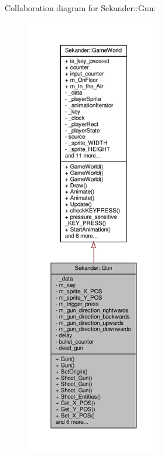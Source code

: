 Collaboration diagram for Sekander\+:\+:Gun\+:
\nopagebreak
\begin{figure}[H]
\begin{center}
\leavevmode
\includegraphics[height=550pt]{classSekander_1_1Gun__coll__graph}
\end{center}
\end{figure}
